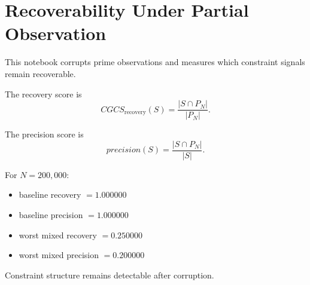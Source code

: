 \section*{Recoverability Under Partial Observation}

This notebook corrupts prime observations and measures which constraint signals remain recoverable.

The recovery score is
\[
CGCS_{\mathrm{recovery}}(S)=
\frac{|S\cap P_N|}{|P_N|}.
\]

The precision score is
\[
precision(S)=
\frac{|S\cap P_N|}{|S|}.
\]

For $N=200,000$:
\begin{itemize}
  \item baseline recovery $= 1.000000$
  \item baseline precision $= 1.000000$
  \item worst mixed recovery $= 0.250000$
  \item worst mixed precision $= 0.200000$
\end{itemize}

Constraint structure remains detectable after corruption.
